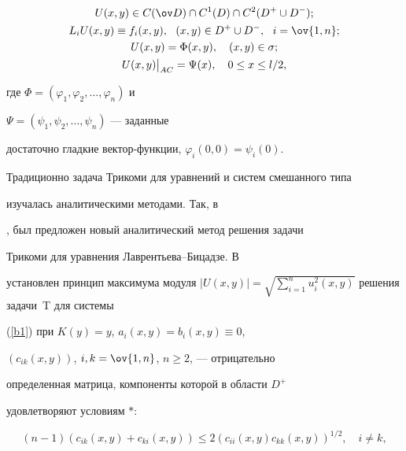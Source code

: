 \begin{gather}\label{b2}


U(x,y)\in C(\ov D)\cap C^1(D)\cap C^2(D^+ \cup D^-); \\


%


\label{b3}


L_iU(x,y)\equiv f_i(x,y),\ \ (x,y)\in D^+ \cup D^-,\ \ i=\ov {1,n};\\


%


\label{b35}


U(x,y)=\Phi(x,y),\quad (x,y)\in \sigma; \\


%


\label{b4}


U(x,y)\big|_{AC}=\Psi(x),\quad 0\le x\le l/2,


\end{gather} 


где $\Phi=(\varphi _1, \varphi _2,\dotsc, \varphi _n)$ и


$\Psi=(\psi_1, \psi_2,\dotsc, \psi_n)$ --- заданные


достаточно гладкие вектор-функции, $\varphi_i(0,0)=\psi_i(0)$.


\medskip





Традиционно задача Трикоми для уравнений и систем смешанного типа


изучалась ана\-литическими методами. Так, в 


\cite{x3}, \cite{x0} был предложен новый аналитический метод решения задачи


Трикоми для уравнения Лаврентьева--Бицадзе. В \cite{5}


установлен принцип максимума модуля $|U(x,y)|=\sqrt{\sum


\limits_{i=1}^n u_i^2(x,y)}$ решения задачи~T для системы


(\ref{b1}) при $K(y)=y$, $a_i(x,y)=b_i(x,y)\equiv0$,


$(c_{ik}(x,y))$, $i,k=\ov {1,n}$, $n\ge 2$, --- отрицательно


определенная матрица, компоненты которой в области $D^+$


удовлетворяют условиям $\ast$:


\begin{equation*} 


(n-1) (c_{ik}(x,y)+ c_{ki}(x,y) )\le 2 


(c_{ii}(x,y)c_{kk}(x,y) )^{1/2},\quad i\ne k, 


\end{equation*}


